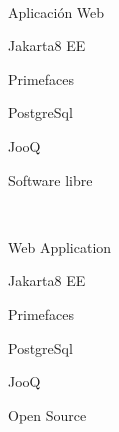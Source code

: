 \begin{multicols}{2}
\begin{description}
\item [\palabraschaveprincipal:] \mbox{} \\[-20pt]
\item Aplicación Web
\item Jakarta8 EE
\item Primefaces
\item PostgreSql
\item JooQ
\item Software libre
\end{description}
\begin{description}
\item [\palabraschavesecundaria:] \mbox{} \\[-20pt]
\item Web Application
\item Jakarta8 EE
\item Primefaces
\item PostgreSql
\item JooQ
\item Open Source
\end{description}
\end{multicols}
